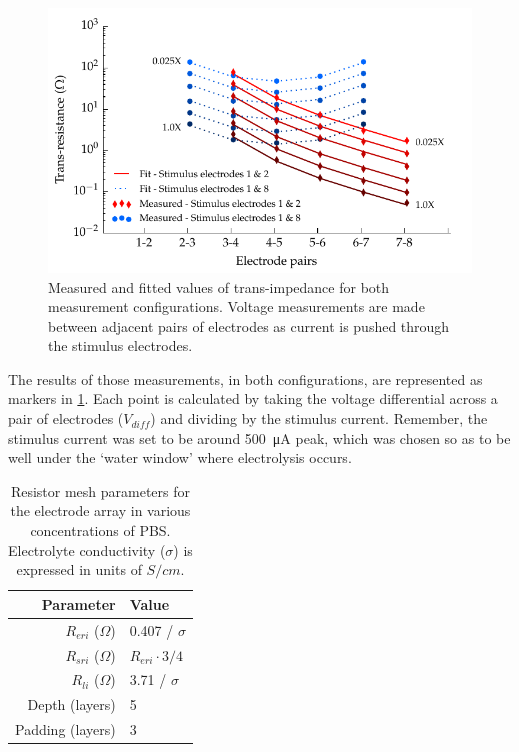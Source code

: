       \begin{figure}
        \centering
        \includegraphics{content/pt2/07-InterfaceModel/graphics/graph_transimpedance_pbs}
        \caption{\label{fig:pt2-graph_transimpedance_pbs}Measured and fitted values of trans-impedance for both measurement configurations. Voltage measurements are made between adjacent pairs of electrodes as current is pushed through the stimulus electrodes.}
      \end{figure}
      The results of those measurements, in both configurations, are represented as markers in \cref{fig:pt2-graph_transimpedance_pbs}.
      Each point is calculated by taking the voltage differential across a pair of electrodes ($V_{diff}$) and dividing by the stimulus current.
      Remember, the stimulus current was set to be around \SI{500}{\micro\ampere} peak, which was chosen so as to be well under the `water window' where electrolysis occurs.
      \begin{table}
        \centering
        \begin{tabular}{r | l}
          Parameter & Value \\
          \hline
          $R_{eri}$ ($\Omega$)& 0.407 / $\sigma$\\
          $R_{sri}$ ($\Omega$)& $R_{eri}\cdot 3/4$\\
          $R_{li}$ ($\Omega$)& 3.71 / $\sigma$ \\
          Depth (layers) & 5 \\
          Padding (layers) & 3 \\
        \end{tabular}
        \caption{\label{tab:RESparams}Resistor mesh parameters for the electrode array in various concentrations of PBS. Electrolyte conductivity ($\sigma$) is expressed in units of $S / cm$.}
      \end{table}

